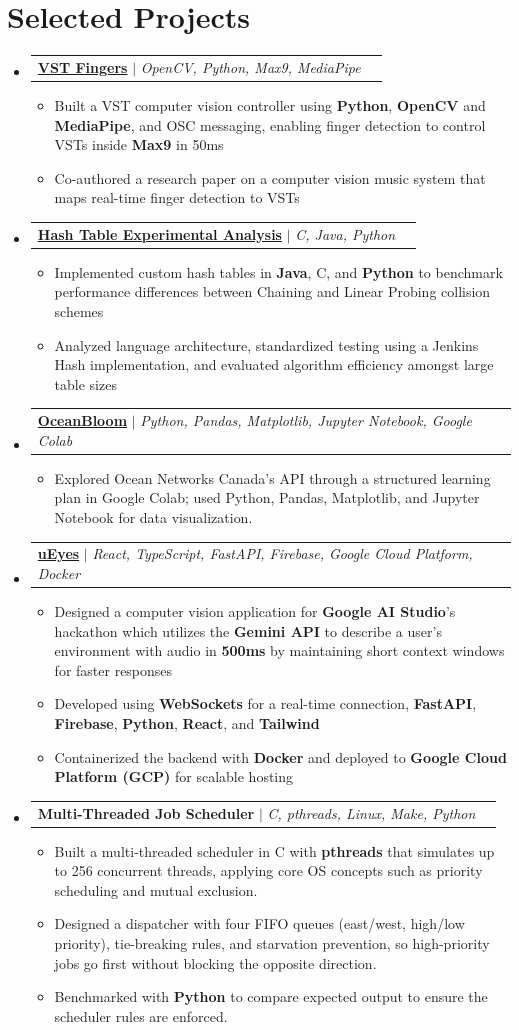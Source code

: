 \documentclass[letterpaper,10pt]{article}
\makeatletter
\newcommand{\resumeItem}[1]{
  \item\small{
    {#1 \vspace{-1pt}}
  }
}
\newcommand{\resumeProjectHeading}[2]{
    \item
    \begin{tabularx}{0.97\textwidth}{@{}Xr@{}}
      \small#1 & #2 \\
    \end{tabularx}\vspace{-6pt}
}
\newcommand{\resumeSubHeadingListStart}{\begin{itemize}[leftmargin=0.15in, label={}]}
\newcommand{\resumeSubHeadingListEnd}{\end{itemize}}
\newcommand{\resumeItemListStart}{\begin{itemize}[label=$\bullet$, itemsep=1.35pt, topsep=0pt, parsep=0pt]}
\newcommand{\resumeItemListEnd}{\end{itemize}\vspace{-2pt}}
\makeatother
\begin{document}
\section{Selected Projects}
\resumeSubHeadingListStart
\resumeProjectHeading{\href{https://github.com/samnne/vst-fingers}{\textbf{VST Fingers}} $|$ \emph{OpenCV, Python, Max9, MediaPipe}}{}
\resumeItemListStart
  \resumeItem{Built a VST computer vision controller using \textbf{Python}, \textbf{OpenCV} and \textbf{MediaPipe}, and OSC messaging, enabling finger detection to control VSTs inside \textbf{Max9} in 50ms}
  \resumeItem{Co-authored a research paper on a computer vision music system that maps real-time finger detection to VSTs}
\resumeItemListEnd
\resumeProjectHeading{\href{https://github.com/samnne/chaining_or_linear_probing}{\textbf{Hash Table Experimental Analysis}} $|$ \emph{C, Java, Python}}{}
\resumeItemListStart
  \resumeItem{Implemented custom hash tables in \textbf{Java}, C, and \textbf{Python} to benchmark performance differences between Chaining and Linear Probing collision schemes}
  \resumeItem{Analyzed language architecture, standardized testing using a Jenkins Hash implementation, and evaluated algorithm efficiency amongst large table sizes}
\resumeItemListEnd
\resumeProjectHeading{\href{https://github.com/samnne/onc-bloom}{\textbf{OceanBloom}} $|$ \emph{Python, Pandas, Matplotlib, Jupyter Notebook, Google Colab}}{}
\resumeItemListStart
  \resumeItem{Explored Ocean Networks Canada's API through a structured learning plan in Google Colab; used Python, Pandas, Matplotlib, and Jupyter Notebook for data visualization.}
\resumeItemListEnd
\resumeProjectHeading{\href{https://github.com/samnne/u-eyes}{\textbf{uEyes}} $|$ \emph{React, TypeScript, FastAPI, Firebase, Google Cloud Platform, Docker}}{}
\resumeItemListStart
  \resumeItem{Designed a computer vision application for \textbf{Google AI Studio}'s hackathon which utilizes the \textbf{Gemini API} to describe a user's environment with audio in \textbf{500ms} by maintaining short context windows for faster responses}
  \resumeItem{Developed using \textbf{WebSockets} for a real-time connection, \textbf{FastAPI}, \textbf{Firebase}, \textbf{Python}, \textbf{React}, and \textbf{Tailwind}}
  \resumeItem{Containerized the backend with \textbf{Docker} and deployed to \textbf{Google Cloud Platform (GCP)} for scalable hosting}
\resumeItemListEnd
\resumeProjectHeading{\textbf{Multi-Threaded Job Scheduler} $|$ \emph{C, pthreads, Linux, Make, Python}}{}
\resumeItemListStart
  \resumeItem{Built a multi-threaded scheduler in C with \textbf{pthreads} that simulates up to 256 concurrent threads, applying core OS concepts such as priority scheduling and mutual exclusion.}
  \resumeItem{Designed a dispatcher with four FIFO queues (east/west, high/low priority), tie-breaking rules, and starvation prevention, so high-priority jobs go first without blocking the opposite direction.}
  \resumeItem{Benchmarked with \textbf{Python} to compare expected output to ensure the scheduler rules are enforced.}
\resumeItemListEnd
\resumeSubHeadingListEnd
\end{document}
